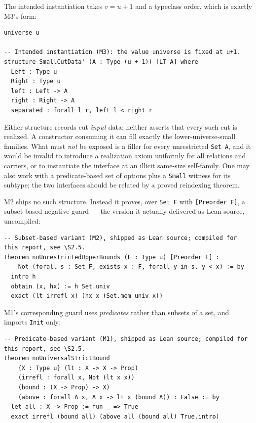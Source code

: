 \documentclass[11pt,letterpaper]{article}
\numberwithin{equation}{section}
\theoremstyle{definition}
\theoremstyle{remark}
\begin{document}
\noindent The intended instantiation takes $v=u+1$ and a typeclass order, which
is exactly M3's form:

\begin{samepage}
\begin{lstlisting}
universe u

-- Intended instantiation (M3): the value universe is fixed at u+1.
structure SmallCutData' (A : Type (u + 1)) [LT A] where
  Left : Type u
  Right : Type u
  left : Left -> A
  right : Right -> A
  separated : forall l r, left l < right r
\end{lstlisting}
\end{samepage}

Either structure records cut \emph{input} data; neither asserts that every such
cut is realized. A constructor consuming it can fill exactly the
lower-universe-small families. What must \emph{not} be exposed is a filler for
every unrestricted \texttt{Set A}, and it would be invalid to introduce a
realization axiom uniformly for all relations and carriers, or to instantiate the
interface at an illicit same-size self-family. One may also work with a
predicate-based set of options plus a \texttt{Small} witness for its subtype; the
two interfaces should be related by a proved reindexing theorem.

M2 ships no such structure. Instead it proves, over \texttt{Set F} with
\texttt{[Preorder F]}, a subset-based negative guard --- the version it actually
delivered as Lean source, uncompiled:

\begin{samepage}
\begin{lstlisting}
-- Subset-based variant (M2), shipped as Lean source; compiled for this report, see \S2.5.
theorem noUnrestrictedUpperBounds (F : Type u) [Preorder F] :
    Not (forall s : Set F, exists x : F, forall y in s, y < x) := by
  intro h
  obtain (x, hx) := h Set.univ
  exact (lt_irrefl x) (hx x (Set.mem_univ x))
\end{lstlisting}
\end{samepage}

\noindent M1's corresponding guard uses \emph{predicates} rather than subsets of
a set, and imports \texttt{Init} only:

\begin{samepage}
\begin{lstlisting}
-- Predicate-based variant (M1), shipped as Lean source; compiled for this report, see \S2.5.
theorem noUniversalStrictBound
    {X : Type u} (lt : X -> X -> Prop)
    (irrefl : forall x, Not (lt x x))
    (bound : (X -> Prop) -> X)
    (above : forall A x, A x -> lt x (bound A)) : False := by
  let all : X -> Prop := fun _ => True
  exact irrefl (bound all) (above all (bound all) True.intro)
\end{lstlisting}
\end{samepage}
\end{document}
